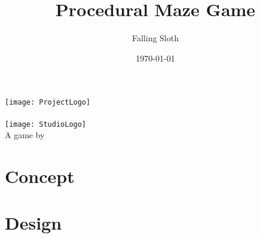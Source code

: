 \documentclass[12pt,a4paper]{article}
\title{Procedural Maze Game}
\author{Falling Sloth}
\date{\today}
\begin{document}
\begin{titlepage}
	\vspace*{\fill}
	\centering
	\texttt{[image: ProjectLogo]}\\[.5cm]
	{\Large \thetitle}\\[1cm]
	\texttt{[image: StudioLogo]}\\[.5cm]
	{\large A game by \theauthor}\\[1cm]
	{\thedate}
	\vspace*{\fill}
\end{titlepage}

\tableofcontents
\pagebreak

\lfoot{\theauthor}\cfoot{\thetitle}

\section{Concept}


\section{Design}

\end{document}
